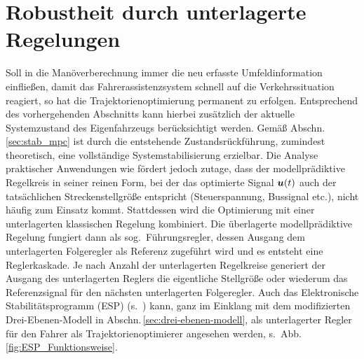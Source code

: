 

\newpage
\section{Robustheit durch unterlagerte Regelungen}\label{sec:unterlagerteRegelung} \label{sec:sys_stab}
Soll in die Manöverberechnung immer die neu erfasste Umfeldinformation einfließen, damit das Fahrerassistenzsystem schnell auf die Verkehrssituation reagiert, so hat die Trajektorienoptimierung permanent zu erfolgen. Entsprechend des vorhergehenden Abschnitts kann hierbei zusätzlich der aktuelle Systemzustand des Eigenfahrzeugs berücksichtigt werden. Gemäß Abschn.\,\ref{sec:stab_mpc} ist durch die entstehende Zustandsrückführung, zumindest theoretisch, eine vollständige Systemstabilisierung erzielbar. Die Analyse praktischer Anwendungen wie \cite{graichen_suboptimal, wahl2003ora, arnold2008mpt, schmidt2012hierarchischer} fördert jedoch zutage, dass der modellprädiktive Regelkreis in seiner reinen Form, bei der das optimierte Signal $\boldsymbol{u}(t)$ auch der tatsächlichen Streckenstellgröße entspricht (Steuerspannung, Bussignal etc.), nicht häufig zum Einsatz kommt. Stattdessen wird die Optimierung mit einer unterlagerten klassischen Regelung kombiniert. Die überlagerte modellprädiktive Regelung fungiert dann als sog.\ Führungsregler, dessen Ausgang dem unterlagerten Folgeregler als Referenz zugeführt wird und es entsteht eine Reglerkaskade. Je nach Anzahl der unterlagerten Regelkreise generiert der Ausgang des unterlagerten Reglers die eigentliche Stellgröße oder wiederum das Referenzsignal für den nächsten unterlagerten Folgeregler. Auch das Elektronische Stabilitätsprogramm (ESP) (s.\ \zB \cite{handbuchFAS_Winner, liebemann2004safety, BHB2012_vanZanten_bremsanlage, vietinghoff2008nichtlineare, trachtler2005integrierte}) kann, ganz im Einklang mit dem modifizierten Drei-Ebenen-Modell in Abschn.\,\ref{sec:drei-ebenen-modell}, als unterlagerter Regler für den Fahrer als Trajektorienoptimierer angesehen werden, s.\ Abb.\,\ref{fig:ESP_Funktionsweise}.
